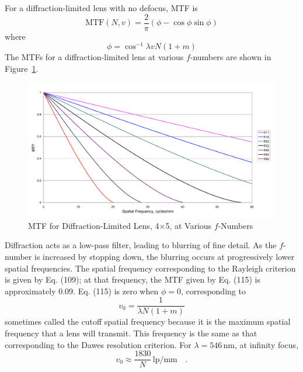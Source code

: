 \documentclass[11pt, oneside]{scrartcl}   	%
\begin{document}
For a diffraction-limited lens with no defocus, 
MTF is 
\begin{equation}
   \mathrm{MTF}(N,v) = \frac2\pi(\phi - \cos\phi\sin\phi)
   \label{eq:MTF2}
\end{equation}
where
\begin{equation}
\phi = \cos^{-1}\lambda vN(1+m)
\end{equation}
The MTFs for a diffraction-limited lens at various $f$-numbers are shown in Figure~\ref{fig:MTF}.
\begin{figure}[htbp] %
   \centering
   \includegraphics[width=\linewidth]{figure/fig_dofd_6} 
   \caption{MTF for Diffraction-Limited Lens, 4×5, at Various $f$-Numbers}
   \label{fig:MTF}
\end{figure}
Diffraction acts as a low-pass filter, leading to blurring of fine detail. As the $f$-number is increased by stopping down, the blurring occurs at progressively lower spatial frequencies. The spatial frequency corresponding to the Rayleigh criterion is given by Eq. (109); at that frequency, the MTF given by Eq. (115) is approximately 0.09. Eq. (115) is zero when $\phi = 0$, corresponding to
\begin{equation}
   v_0 = \frac1{\lambda N(1+m)}
   \label{eq:v0}
\end{equation}
sometimes called the cutoff spatial frequency because it is the maximum spatial frequency that a lens will transmit. This frequency is the same as that corresponding to the Dawes resolution criterion. For $λ = 546$\,nm, at infinity focus,
\begin{equation}
v_0 \approx \frac{1830}N\,\mathrm{lp/mm}\quad.
\end{equation}                                
\end{document}
